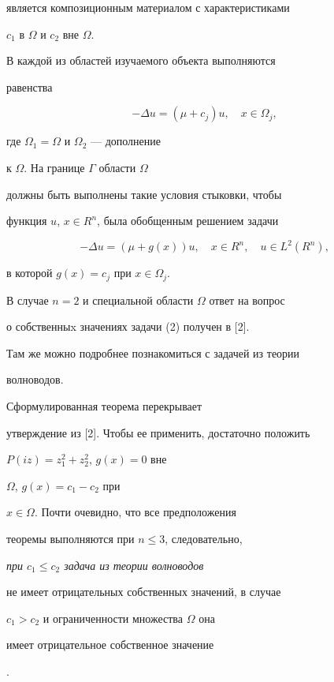 является композиционным материалом с характеристиками


$c_{1}$ в $\Omega$ и $c_{2}$ вне $\Omega$.


В каждой из областей изучаемого объекта выполняются


равенства


$$


- \Delta u = (\mu + c_{j})u, \quad x \in \Omega_{j},


$$


где $\Omega_{1} = \Omega$ и $\Omega_{2}$ --- дополнение


к $\Omega$. На границе $\Gamma$ области $\Omega$


должны быть выполнены такие условия стыковки, чтобы 


функция $u$, $x \in R^{n}$, была обобщенным решением задачи


\begin{equation}


- \Delta u = (\mu + g(x))u,\quad x \in R^{n},\quad


u \in L^{2}{(R^{n})},


\end{equation}


в которой $ g(x) = c_{j}$ при $x \in\Omega_{j}$.





В случае $n=2$ и специальной области $\Omega$ ответ на вопрос


о собственныx значениях задачи (2) получен в [2].


Там же можно подробнее познакомиться с задачей из теории


волноводов.


Сформулированная теорема перекрывает


утверждение из [2]. Чтобы ее применить, достаточно положить


$P(iz)=z_{1}^{2} + z_{2}^{2}$, $g(x)=0$ вне


$\Omega$, $g(x)= c_{1} - c_{2}$ при


$x \in \Omega$. Почти очевидно, что все предположения


теоремы выполняются при $n \le 3$, следовательно,


{\em при $c_{1} \le c_{2}$ задача из теории волноводов


не имеет отрицательных собственных значений, в случае


$c_{1} > c_{2}$ и ограниченности множества $\Omega $ она


имеет отрицательное собственное значение}.



